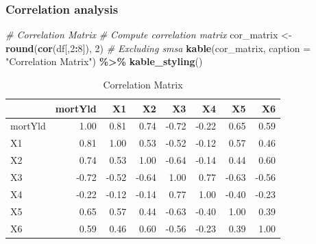 \documentclass[
  12pt,
]{article}
\newenvironment{Shaded}{\begin{snugshade}}{\end{snugshade}}
\newcommand{\AttributeTok}[1]{\textcolor[rgb]{0.13,0.29,0.53}{#1}}
\newcommand{\CommentTok}[1]{\textcolor[rgb]{0.56,0.35,0.01}{\textit{#1}}}
\newcommand{\DecValTok}[1]{\textcolor[rgb]{0.00,0.00,0.81}{#1}}
\newcommand{\FunctionTok}[1]{\textcolor[rgb]{0.13,0.29,0.53}{\textbf{#1}}}
\newcommand{\NormalTok}[1]{#1}
\newcommand{\OtherTok}[1]{\textcolor[rgb]{0.56,0.35,0.01}{#1}}
\newcommand{\SpecialCharTok}[1]{\textcolor[rgb]{0.81,0.36,0.00}{\textbf{#1}}}
\newcommand{\StringTok}[1]{\textcolor[rgb]{0.31,0.60,0.02}{#1}}
\begin{document}
\subsubsection{Correlation analysis}\label{correlation-analysis}

\begin{Shaded}
\begin{Highlighting}[]
\CommentTok{\# Correlation Matrix}
\CommentTok{\# Compute correlation matrix}
\NormalTok{cor\_matrix }\OtherTok{\textless{}{-}} \FunctionTok{round}\NormalTok{(}\FunctionTok{cor}\NormalTok{(df[,}\DecValTok{2}\SpecialCharTok{:}\DecValTok{8}\NormalTok{]), }\DecValTok{2}\NormalTok{)  }\CommentTok{\# Excluding \textquotesingle{}smsa\textquotesingle{}}
\FunctionTok{kable}\NormalTok{(cor\_matrix, }\AttributeTok{caption =} \StringTok{"Correlation Matrix"}\NormalTok{) }\SpecialCharTok{\%\textgreater{}\%} \FunctionTok{kable\_styling}\NormalTok{()}
\end{Highlighting}
\end{Shaded}

\begin{longtable}[t]{lrrrrrrr}
\caption{\label{tab:unnamed-chunk-7}Correlation Matrix}\\
\toprule
 & mortYld & X1 & X2 & X3 & X4 & X5 & X6\\
\midrule
mortYld & 1.00 & 0.81 & 0.74 & -0.72 & -0.22 & 0.65 & 0.59\\
X1 & 0.81 & 1.00 & 0.53 & -0.52 & -0.12 & 0.57 & 0.46\\
X2 & 0.74 & 0.53 & 1.00 & -0.64 & -0.14 & 0.44 & 0.60\\
X3 & -0.72 & -0.52 & -0.64 & 1.00 & 0.77 & -0.63 & -0.56\\
X4 & -0.22 & -0.12 & -0.14 & 0.77 & 1.00 & -0.40 & -0.23\\
\addlinespace
X5 & 0.65 & 0.57 & 0.44 & -0.63 & -0.40 & 1.00 & 0.39\\
X6 & 0.59 & 0.46 & 0.60 & -0.56 & -0.23 & 0.39 & 1.00\\
\bottomrule
\end{longtable}

\begin{Shaded}
\end{Shaded}
\end{document}
